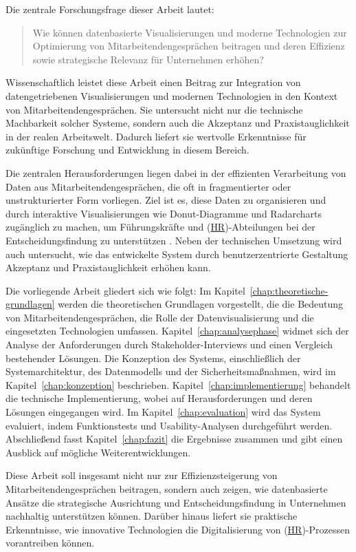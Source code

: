 Die zentrale Forschungsfrage dieser Arbeit lautet: \begin{quote} Wie können datenbasierte Visualisierungen und moderne Technologien zur Optimierung von Mitarbeitendengesprächen beitragen und deren Effizienz sowie strategische Relevanz für Unternehmen erhöhen? \end{quote}

Wissenschaftlich leistet diese Arbeit einen Beitrag zur Integration von datengetriebenen Visualisierungen und modernen Technologien in den Kontext von Mitarbeitendengesprächen. Sie untersucht nicht nur die technische Machbarkeit solcher Systeme, sondern auch die Akzeptanz und Praxistauglichkeit in der realen Arbeitswelt. Dadurch liefert sie wertvolle Erkenntnisse für zukünftige Forschung und Entwicklung in diesem Bereich.

Die zentralen Herausforderungen liegen dabei in der effizienten Verarbeitung von Daten aus Mitarbeitendengesprächen, die oft in fragmentierter oder unstrukturierter Form vorliegen. Ziel ist es, diese Daten zu organisieren und durch interaktive Visualisierungen wie Donut-Diagramme und Radarcharts zugänglich zu machen, um Führungskräfte und (\hyperref[abkuerzungen]{HR})-Abteilungen bei der Entscheidungsfindung zu unterstützen \cite{Evergreen2016}. Neben der technischen Umsetzung wird auch untersucht, wie das entwickelte System durch benutzerzentrierte Gestaltung Akzeptanz und Praxistauglichkeit erhöhen kann.

Die vorliegende Arbeit gliedert sich wie folgt: Im Kapitel~\ref{chap:theoretische-grundlagen} werden die theoretischen Grundlagen vorgestellt, die die Bedeutung von Mitarbeitendengesprächen, die Rolle der Datenvisualisierung und die eingesetzten Technologien umfassen. Kapitel~\ref{chap:analysephase} widmet sich der Analyse der Anforderungen durch Stakeholder-Interviews und einen Vergleich bestehender Lösungen. Die Konzeption des Systems, einschließlich der Systemarchitektur, des Datenmodells und der Sicherheitsmaßnahmen, wird im Kapitel~\ref{chap:konzeption} beschrieben. Kapitel~\ref{chap:implementierung} behandelt die technische Implementierung, wobei auf Herausforderungen und deren Lösungen eingegangen wird. Im Kapitel~\ref{chap:evaluation} wird das System evaluiert, indem Funktionstests und Usability-Analysen durchgeführt werden. Abschließend fasst Kapitel~\ref{chap:fazit} die Ergebnisse zusammen und gibt einen Ausblick auf mögliche Weiterentwicklungen.

Diese Arbeit soll insgesamt nicht nur zur Effizienzsteigerung von Mitarbeitendengesprächen beitragen, sondern auch zeigen, wie datenbasierte Ansätze die strategische Ausrichtung und Entscheidungsfindung in Unternehmen nachhaltig unterstützen können. Darüber hinaus liefert sie praktische Erkenntnisse, wie innovative Technologien die Digitalisierung von (\hyperref[abkuerzungen]{HR})-Prozessen vorantreiben können.
